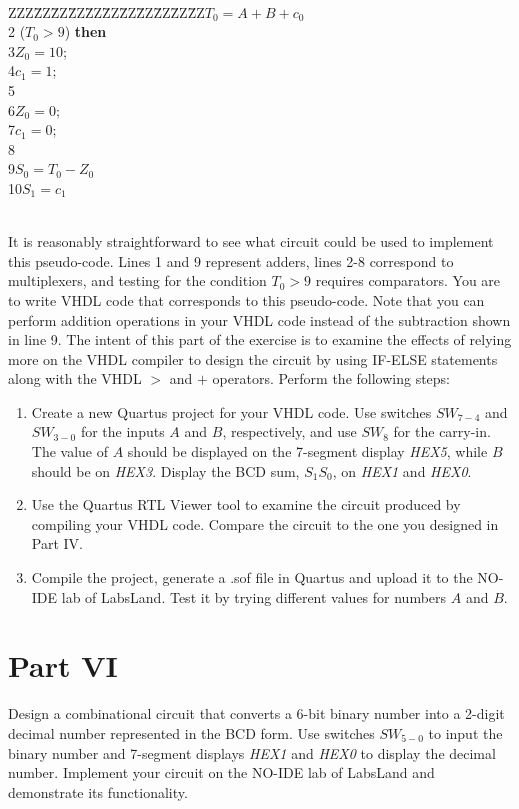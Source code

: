\documentclass[epsfig,10pt,fullpage]{article}
\newcommand{\CommonDocsPath}{../../../common/docs}
\begin{document}
~\\
\begin{center}
\begin{minipage}[t]{12.5 cm}
\begin{tabbing}
ZZZ\=ZZ\=ZZ\=ZZ\=ZZ\=ZZ\=ZZ\=ZZ\=ZZ\=ZZ\=ZZ\>$T_0 = A + B + c_0$ \\
2 ($T_0 > 9$) {\bf then}\\
3\>\>$Z_0 = 10$;\\
4\>\>$c_1 = 1$;\\
5\\
6\>\>$Z_0 = 0$;\\
7\>\>$c_1 = 0$;\\
8\\
9\>$S_0 = T_0 - Z_0$\\
10\>$S_1 = c_1$\\
\end{tabbing}
\end{minipage}
\end{center}
~\\
It is reasonably straightforward to see what circuit could be used to implement this
pseudo-code. Lines 1 and 9 represent adders, lines 2-8 correspond to
multiplexers, and testing for the condition $T_0 > 9$ requires comparators.
You are to write VHDL code that corresponds to this pseudo-code. Note that you can
perform addition operations in your VHDL code instead of the subtraction shown 
in line 9. The intent of this part of the exercise is
to examine the effects of relying more on the VHDL compiler to design the circuit by using
IF-ELSE statements along with the VHDL $>$ and $+$ operators. 
Perform the following steps:

\begin{enumerate}
\item Create a new Quartus project for your VHDL code. Use switches $SW_{7-4}$ and $SW_{3-0}$ for the inputs $A$ and $B$, respectively, and
use $SW_{8}$ for the carry-in.
The value of $A$ should be displayed on the 7-segment display {\it HEX5}, 
while $B$ should be on {\it HEX3}.
Display the BCD sum, $S_1 S_0$, on {\it HEX1} and {\it HEX0}.
\item Use the Quartus RTL Viewer tool to examine the circuit produced by compiling your
VHDL code. Compare the circuit to the one you designed in Part IV.
\item Compile the project, generate a .sof file in Quartus and upload it to the NO-IDE lab of LabsLand. Test it by trying different values for
	numbers $A$ and $B$.
\end{enumerate}

\section*{Part VI}
Design a combinational circuit that converts a 6-bit binary number into 
a 2-digit decimal number represented in the BCD form. 
Use switches $SW_{5-0}$ to input the binary number and 7-segment displays 
{\it HEX1} and {\it HEX0} to display the decimal number.
Implement your circuit on the NO-IDE lab of LabsLand and demonstrate its functionality.


\end{document}
